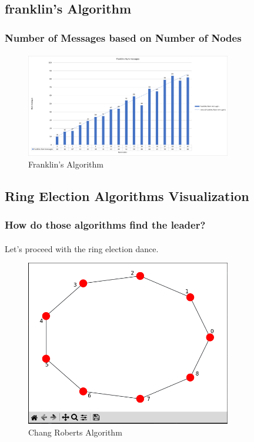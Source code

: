 \documentclass[11pt]{beamer}              %
\begin{document}
\subsection{franklin's Algorithm}
\begin{frame}
\frametitle{Number of Messages based on Number of Nodes}
\framesubtitle{}

\begin{figure}
    \centering
    \includegraphics[width=0.8\textwidth]{figures/franklins_graph.png}
    \caption{Franklin's Algorithm}
\end{figure}
\end{frame}

\subsection{Ring Election Algorithms Visualization}
\begin{frame}
\frametitle{How do those algorithms find the leader?}
\framesubtitle{}
Let's proceed with the ring election dance.
\end{frame}

\begin{frame}
\begin{figure}
    \centering
    \includegraphics[width=0.8\textwidth]{figures/algo1cr.png}
    \caption{Chang Roberts Algorithm}
\end{figure}
\end{frame}
\end{document}
